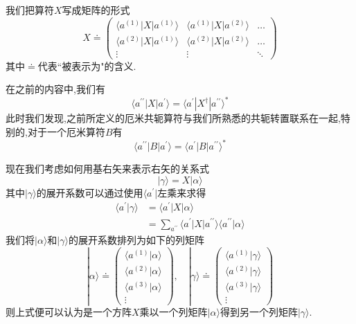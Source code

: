 \documentclass[lang=cn,newtx,10pt,scheme=chinese,thmcnt=section]{elegantbook}
\begin{document}
我们把算符$X$写成矩阵的形式
\begin{equation}
	X\doteq
	\begin{pmatrix}
		\langle a^{(1)}| X| a^{(1)}\rangle&\langle a^{(1)}| X| a^{(2)}\rangle&\ldots\\
		\langle a^{(2)}| X| a^{(1)}\rangle&\langle a^{(2)}| X| a^{(2)}\rangle&\ldots\\
		\vdots&\vdots&\ddots
	\end{pmatrix}
\end{equation}
其中$\doteq$代表``被表示为"的含义.

在之前的内容中,我们有
$$\langle a^{\prime\prime}| X| a^{\prime}\rangle=\langle a^{\prime}| X^\dagger| a^{\prime\prime}\rangle^*$$
此时我们发现,之前所定义的厄米共轭算符与我们所熟悉的共轭转置联系在一起,特别的,对于一个厄米算符$B$有
\begin{equation}
	\langle a^{\prime\prime}|B| a^{\prime}\rangle=\langle a^{\prime}| B| a^{\prime\prime}\rangle^*
\end{equation}

现在我们考虑如何用基右矢来表示右矢的关系式
\begin{equation}
	|\gamma\rangle=X|\alpha\rangle 
\end{equation}
其中$|\gamma\rangle$的展开系数可以通过使用$\langle a^{'}|$左乘来求得
\begin{equation}
	\begin{aligned}\langle a^{\prime}|\gamma\rangle&=\langle a^{\prime}| X|\alpha\rangle\\&=\sum_{a^{\prime\prime}}\langle a^{\prime}| X| a^{\prime\prime}\rangle\langle a^{\prime\prime}|\alpha\rangle\end{aligned}
\end{equation}
我们将$|\alpha\rangle$和$|\gamma\rangle$的展开系数排列为如下的列矩阵
\begin{equation}
	|\alpha\rangle\doteq\begin{pmatrix}\langle a^{(1)}|\alpha\rangle\\\langle a^{(2)}|\alpha\rangle\\\langle a^{(3)}|\alpha\rangle\\\vdots\end{pmatrix},\quad|\gamma\rangle\doteq
	\begin{pmatrix}\langle a^{(1)}|\gamma\rangle\\\langle a^{(2)}|\gamma\rangle\\\langle a^{(3)}|\gamma\rangle\\\vdots\end{pmatrix}
\end{equation}
则上式便可以认为是一个方阵$X$乘以一个列矩阵$|\alpha\rangle$得到另一个列矩阵$|\gamma\rangle$.
\end{document}
